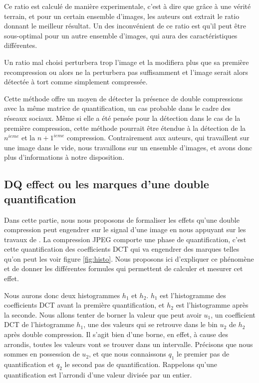 \documentclass[utf8,final]{stageM2R} %
\begin{document}
Ce ratio est calculé de manière experimentale, c'est à dire que grâce à une vérité terrain, et pour un certain ensemble d'images, les auteurs ont extrait le ratio donnant le meilleur résultat. Un des inconvénient de ce ratio est qu'il peut être sous-optimal pour un autre ensemble d'images, qui aura des caractéristiques différentes.

Un ratio mal choisi perturbera trop l'image et la modifiera plus que sa première recompression ou alors ne la perturbera pas suffisamment et l'image serait alors détectée à tort comme simplement compressée.

Cette méthode offre un moyen de détecter la présence de double compressions avec la même matrice de quantification, un cas probable dans le cadre des réseaux sociaux. Même si elle a été pensée pour la détection dans le cas de la première compression, cette méthode pourrait être étendue à la détection de la $n^{ieme}$ et la $n+1^{ieme}$ compression. Contrairement aux auteurs, qui travaillent sur une image dans le vide, nous travaillons sur un ensemble d'images, et avons donc plus d'informations à notre disposition.

\subsection{DQ effect ou les marques d'une double quantification}
Dans cette partie, nous nous proposons de formaliser les effets qu'une double compression peut engendrer sur le signal d'une image en nous appuyant sur les travaux de \autocite{lin2009fast}. La compression JPEG comporte une phase de quantification, c'est cette quantification des coefficients DCT qui va engendrer des marques telles qu'on peut les voir figure \ref{fig:histo}. Nous proposons ici d'expliquer ce phénomène et de donner les différentes formules qui permettent de calculer et mesurer cet effet.

Nous aurons donc deux histogrammes $h_1$ et $h_2$. $h_1$ est l'histogramme des coefficients DCT avant la première quantification, et $h_2$ est l'histogramme après la seconde. Nous allons tenter de borner la valeur que peut avoir $u_1$, un coefficient DCT de l'histogramme $h_1$, une des valeurs qui se retrouve dans le bin $u_2$ de $h_2$ après double compression. Il s'agit bien d'une borne, en effet, à cause des arrondis, toutes les valeurs vont se trouver dans un intervalle. Précisons que nous sommes en possession de $u_2$, et que nous connaissons $q_1$ le premier pas de quantification et $q_2$ le second pas de quantification. Rappelons qu'une quantification est l'arrondi d'une valeur divisée par un entier.
\end{document}
